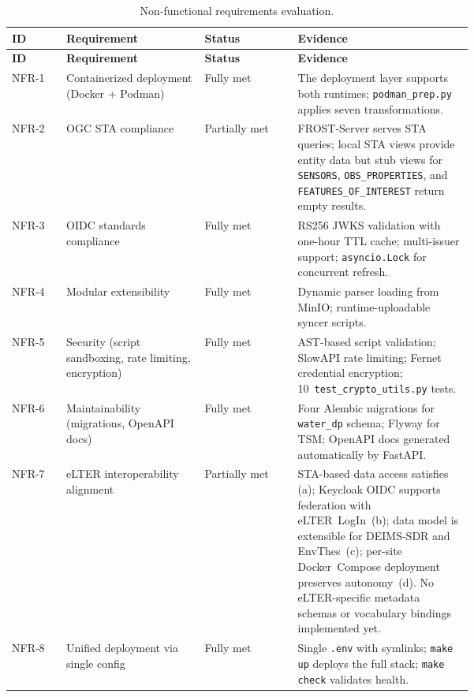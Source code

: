 \begin{landscape}
{\small
\begin{longtable}{l p{0.30\linewidth} l p{0.38\linewidth}}
  \caption{Non-functional requirements evaluation.}
  \label{tab:req-evaluation-nfr} \\
  \textbf{ID} & \textbf{Requirement} & \textbf{Status} & \textbf{Evidence} \\
  \hline
  \endfirsthead
  \textbf{ID} & \textbf{Requirement} & \textbf{Status} & \textbf{Evidence} \\
  \hline
  \endhead
  NFR-1 & Containerized deployment (Docker + Podman)
        & Fully met
        & The deployment layer supports both runtimes; \texttt{podman\_prep.py}
          applies seven transformations. \\[3pt]
  NFR-2 & OGC STA compliance
        & Partially met
        & FROST-Server serves STA queries; local STA views provide entity data
          but stub views for \texttt{SENSORS}, \texttt{OBS\_PROPERTIES}, and
          \texttt{FEATURES\_OF\_INTEREST} return empty results. \\[3pt]
  NFR-3 & OIDC standards compliance
        & Fully met
        & RS256 JWKS validation with one-hour TTL cache; multi-issuer support;
          \texttt{asyncio.Lock} for concurrent refresh. \\[3pt]
  NFR-4 & Modular extensibility
        & Fully met
        & Dynamic parser loading from MinIO; runtime-uploadable syncer
          scripts. \\[3pt]
  NFR-5 & Security (script sandboxing, rate limiting, encryption)
        & Fully met
        & AST-based script validation; SlowAPI rate limiting; Fernet credential
          encryption; 10~\texttt{test\_crypto\_utils.py} tests. \\[3pt]
  NFR-6 & Maintainability (migrations, OpenAPI docs)
        & Fully met
        & Four Alembic migrations for \texttt{water\_dp} schema; Flyway for
          TSM; OpenAPI docs generated automatically by FastAPI. \\[3pt]
  NFR-7 & eLTER interoperability alignment
        & Partially met
        & STA-based data access satisfies (a); Keycloak OIDC supports federation
          with eLTER~LogIn~(b); data model is extensible for DEIMS-SDR and
          EnvThes~(c); per-site Docker~Compose deployment preserves
          autonomy~(d). No eLTER-specific metadata schemas or vocabulary
          bindings implemented yet. \\[3pt]
  NFR-8 & Unified deployment via single config
        & Fully met
        & Single \texttt{.env} with symlinks; \texttt{make up} deploys the
          full stack; \texttt{make check} validates health. \\
\end{longtable}
}
\end{landscape}

